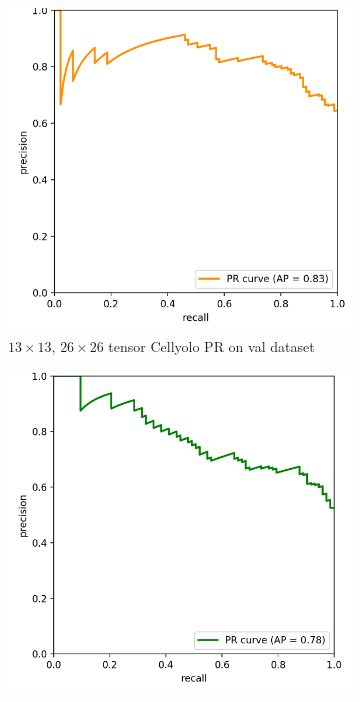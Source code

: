 \begin{figure}[h]
	\begin{center}
		\begin{subfigure}[b]{0.49\textwidth}
			\includegraphics[width=\textwidth]{thesis-template-master/images/2 tensor cellyolo PR on val dataset.png}
			\caption{$13 \times 13$, $26 \times 26$ tensor Cellyolo PR on val dataset}
			\label{fig:res18}
		\end{subfigure}
		\begin{subfigure}[b]{0.49\textwidth}
		    \centering
			\includegraphics[width=\textwidth]{thesis-template-master/images/52 tensor cellyolo PR on val dataset.png}

\end{subfigure}
\end{center}
\end{figure}
